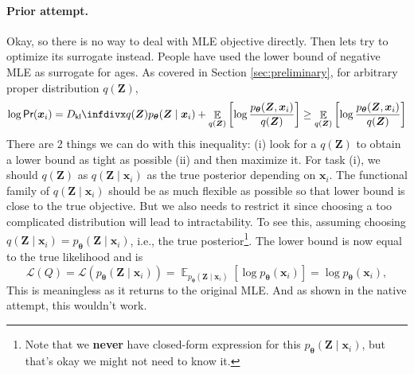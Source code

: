 \documentclass[11pt,a4paper]{article}
\begin{document}
\paragraph{Prior attempt.} 
Okay, so there is no way to deal with MLE objective directly. 
Then lets try to optimize its surrogate instead.
People have used the lower bound of negative MLE as surrogate for ages.
As covered in Section \ref{sec:preliminary}, for arbitrary proper distribution $q(\bm{Z})$,
\begin{equation}
\log \textsf{Pr}(\bm{x}_i) = \Dkl{q(\bm{Z})}{p_{\boldsymbol \theta}(\bm{Z} \mid \bm{x}_i)} + \mathop{\mathbb{E}}_{q(\bm{Z})} \left[ \log \dfrac{p_{\boldsymbol \theta}(\bm{Z}, \bm{x}_i)}{q(\bm{Z})} \right]
\geq \mathop{\mathbb{E}}_{q(\bm{Z})} \left[ \log \dfrac{p_{\boldsymbol \theta}(\bm{Z}, \bm{x}_i)}{q(\bm{Z})} \right]
\label{eq:elbo_lower_bound}
\end{equation} 
There are 2 things we can do with this inequality: (i) look for a $q(\bm{Z})$ to obtain a lower bound as tight as possible (ii) and then maximize it. 
For task (i), we should $q(\bm{Z})$ as $q(\bm{Z} \mid \bm{x}_i)$ as the true posterior depending on $\bm{x}_i$. 
The functional family of $q(\bm{Z} \mid \bm{x}_i)$ should be as much flexible as possible so that lower bound is close to the true objective. But we also needs to restrict it since choosing a too complicated distribution will lead to intractability.
To see this, assuming choosing $q(\bm{Z} \mid \bm{x}_i) = p_{\boldsymbol \theta}(\bm{Z} \mid \bm{x}_i)$, i.e., the true posterior\footnote{ Note that we \textbf{never} have closed-form expression for this $p_{\boldsymbol \theta}(\bm{Z} \mid \bm{x}_i)$, but that's okay we might not need to know it.}. The lower bound is now equal to the true likelihood and is
\[
\mathcal{L}(Q) = 
\mathcal{L}(p_{\boldsymbol \theta}(\bm{Z} \mid \bm{x}_i)) 
= \mathop{\mathbb{E}}_{p_{\boldsymbol \theta}(\bm{Z} \mid \bm{x}_i)} \left[ \log p_{\boldsymbol \theta}(\bm{x}_i) \right]
=  \log p_{\boldsymbol \theta}(\bm{x}_i),
\] 
This is meaningless as it returns to the original MLE. And as shown in the native attempt, this wouldn't work.
\end{document}
